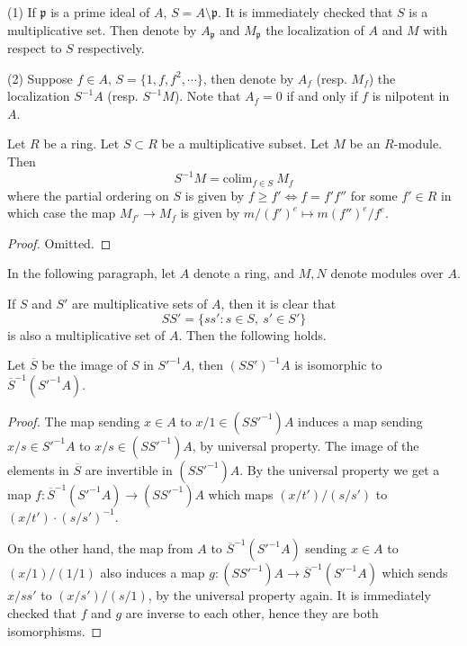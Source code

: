 \begin{example}
(1) If $\mathfrak p$ is a prime ideal of $A$, $S = A\setminus\mathfrak p$. It is
immediately checked that $S$ is a multiplicative set. Then denote by
$A_\mathfrak p$ and $M_\mathfrak p$ the localization of $A$ and $M$ with
respect to
$S$ respectively.

(2) Suppose $f\in A$, $S = \{1, f, f^2, \cdots\}$, then denote by $A_f$
(resp. $M_f$) the localization $S^{-1}A$ (resp. $S^{-1}M$). Note
that $A_f = 0$ if and only if $f$ is nilpotent in $A$.
\end{example}

\begin{lemma}
\label{lemma-localization-colimit}
Let $R$ be a ring.
Let $S \subset R$ be a multiplicative subset.
Let $M$ be an $R$-module.
Then
$$
S^{-1}M = \text{colim}_{f \in S}\ M_f
$$
where the partial ordering on $S$ is given by
$f \geq f' \Leftrightarrow f = f'f''$ for some $f' \in R$
in which case the map $M_{f'} \to M_f$ is given
by $m/(f')^e \mapsto m(f'')^e/f^e$.
\end{lemma}

\begin{proof}
Omitted.
\end{proof}

\noindent
In the following paragraph,
let $A$ denote a ring,
and $M, N$ denote modules over $A$.

\medskip\noindent
If $S$ and $S'$ are multiplicative sets of $A$, then it is
clear that
$$
SS' = \{ss' : s\in S, \ s'\in S'\}
$$
is also a multiplicative set of $A$. Then the following holds.

\begin{proposition}
Let $\overline{S}$ be the image of $S$ in $S'^{-1}A$, then
$(SS')^{-1}A$ is isomorphic to $\overline{S}^{-1}(S'^{-1}A)$.
\end{proposition}

\begin{proof}
The map sending $x\in A$ to $x/1\in (SS'^{-1})A$ induces a map
sending $x/s\in S'^{-1}A$ to $x/s \in (SS'^{-1})A$, by universal
property. The image of the elements in $\overline{S}$ are invertible
in $(SS'^{-1})A$. By the universal property we get a map
$f : \overline{S}^{-1}(S'^{-1}A)\rightarrow (SS'^{-1})A$ which maps
$(x/t')/(s/s')$ to $(x/t')\cdot(s/s')^{-1}$.

\medskip\noindent
On the other hand, the map from $A$ to $\overline{S}^{-1}(S'^{-1}A)$
sending $x\in A$ to $(x/1)/(1/1)$ also induces a map
$g : (SS'^{-1})A\rightarrow \overline{S}^{-1}(S'^{-1}A)$ which sends $x/ss'$
to $(x/s')/(s/1)$, by the universal property again. It is
immediately checked that $f$ and $g$ are inverse to each other,
hence they are both isomorphisms.
\end{proof}

